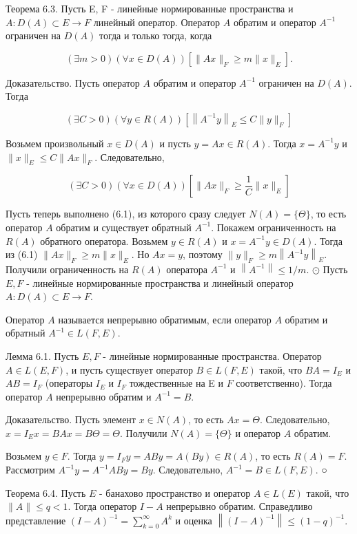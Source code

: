 Теорема 6.3. Пусть E, F - линейные нормированные пространства и $A: D(A) \subset E \rightarrow F$ линейный оператор. Оператор $A$ обратим и оператор $A^{-1}$ ограничен на $D(A)$ тогда и только тогда, когда

$$
(\exists m>0)(\forall x \in D(A))\left[\|A x\|_{F} \geq m\|x\|_{E}\right] .
$$

Доказательство. Пусть оператор $A$ обратим и оператор $A^{-1}$ ограничен на $D(A)$. Тогда

$$
(\exists C>0)(\forall y \in R(A))\left[\left\|A^{-1} y\right\|_{E} \leq C\|y\|_{F}\right]
$$

Возьмем произвольный $x \in D(A)$ и пусть $y=A x \in R(A)$. Тогда $x=A^{-1} y$ и $\|x\|_{E} \leq C\|A x\|_{F}$. Следовательно,

$$
(\exists C>0)(\forall x \in D(A))\left[\|A x\|_{F} \geq \frac{1}{C}\|x\|_{E}\right]
$$

Пусть теперь выполнено (6.1), из которого сразу следует $N(A)=\{\Theta\}$, то есть оператор $A$ обратим и существует обратный $A^{-1}$. Покажем ограниченность на $R(A)$ обратного оператора. Возьмем $y \in R(A)$ и $x=A^{-1} y \in D(A)$. Тогда из (6.1) $\|A x\|_{F} \geq m\|x\|_{E}$. Но $A x=y$, поэтому $\|y\|_{F} \geq m\left\|A^{-1} y\right\|_{E}$. Получили ограниченность на $R(A)$ оператора $A^{-1}$ и $\left\|A^{-1}\right\| \leq 1 / m$. $\odot$ Пусть $E, F$ - линейные нормированные пространства и линейный оператор $A: D(A) \subset E \rightarrow F$. 

Оператор $A$ называется непрерывно обратимым, если оператор $A$ обратим и обратный $A^{-1} \in L(F, E)$.

Лемма 6.1. Пусть $E, F$ - линейные нормированные пространства. Оператор $A \in L(E, F)$, и пусть существует оператор $B \in L(F, E)$ такой, что $B A=I_{E}$ и $A B=I_{F}$ (операторы $I_{E}$ и $I_{F}$ тождественные на E и $F$ соответственно). Тогда оператор $A$ непрерывно обратим и $A^{-1}=B$.

Доказательство. Пусть элемент $x \in N(A)$, то есть $A x=\Theta$. Следовательно, $x=I_{E} x=B A x=B \Theta=\Theta$. Получили $N(A)=\{\Theta\}$ и оператор $A$ обратим.

Возьмем $y \in F$. Тогда $y=I_{F} y=A B y=A(B y) \in R(A)$, то есть $R(A)=F$. Рассмотрим $A^{-1} y=A^{-1} A B y=B y$. Следовательно, $A^{-1}=B \in L(F, E)$. ○

Теорема 6.4. Пусть $E$ - банахово пространство и оператор $A \in L(E)$ такой, что $\|A\| \leq q<1$. Тогда оператор $I-A$ непрерывно обратим. Справедливо представление $(I-A)^{-1}=\sum_{k=0}^{\infty} A^{k}$ и оценка $\left\|(I-A)^{-1}\right\| \leq(1-q)^{-1}$.

